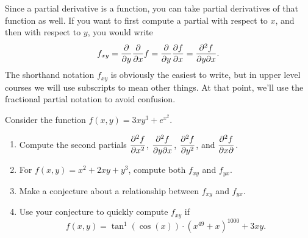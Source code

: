 Since a partial derivative is a function, you can take partial derivatives of that function as well.  If you want to first compute a partial with respect to $x$, and then with respect to $y$, you would write $$f_{xy}=\displaystyle\frac{\partial}{\partial y}\frac{\partial}{\partial x}f = \frac{\partial}{\partial y}\frac{\partial f}{\partial x} = \frac{\partial^2 f}{\partial y \partial x}.$$
The shorthand notation $f_{xy}$ is obviously the easiest to write, but in upper level courses we will use subscripts to mean other things. At that point, we'll use the fractional partial notation to avoid confusion.


\begin{problem}
Consider the function $f(x,y)=3xy^3+e^{x^2}.$
\begin{enumerate}
 \item Compute the second partials $\displaystyle \frac{\partial^2 f}{ \partial x^2}$, $\displaystyle\frac{\partial^2 f}{\partial y \partial x}$, $\displaystyle\frac{\partial^2 f}{\partial y^2}$, and $\displaystyle\frac{\partial^2 f}{\partial x \partial }$.
 \item For $f(x,y)=x^2+2xy+y^3$, compute both $f_{xy}$ and $f_{yx}$.  
 \item Make a conjecture about a relationship between $f_{xy}$ and $f_{yx}$.
 \item Use your conjecture to quickly compute $f_{xy}$ if $$f(x,y)=\tan^{1}(\cos(x))\cdot (x^{49}+x)^{1000}+3xy.$$ 
\end{enumerate}
\end{problem}



